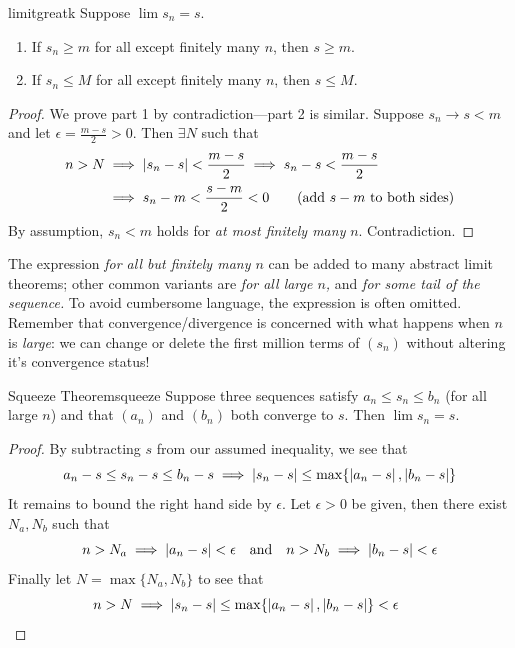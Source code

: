 \begin{thm}{}{limitgreatk}
	Suppose $\lim s_n=s$.
	\begin{enumerate}
	  \item If $s_n\ge m$ for all except finitely many $n$, then $s\ge m$.
	  \item If $s_n\le M$ for all except finitely many $n$, then $s\le M$.
	\end{enumerate} 
\end{thm}

\begin{proof}
	We prove part 1 by contradiction---part 2 is similar.\smallbreak
	Suppose $s_n\to s<m$ and let $\epsilon=\frac{m-s}2>0$. Then $\exists N$ such that
	\begin{align*}
	n>N&\implies \left| s_n-s\right|<\frac{m-s}2\implies s_n-s<\frac{m-s}2\\
	&\implies s_n-m<\frac{s-m}2<0\tag*{(add $s-m$ to both sides)}
	\end{align*}
	By assumption, $s_n<m$ holds for \emph{at most finitely many} $n$. Contradiction.
\end{proof}

The expression \emph{for all but finitely many $n$} can be added to many abstract limit theorems; other common variants are \emph{for all large $n$,} and \emph{for some tail of the sequence.} To avoid cumbersome language, the expression is often omitted. Remember that convergence/divergence is concerned with what happens when $n$ is \emph{large}: we can change or delete the first million terms of $(s_n)$ without altering it's convergence status!

\vfil\vfil
\goodbreak


\begin{thm}{Squeeze Theorem}{squeeze}
	Suppose three sequences satisfy $a_n\le s_n\le b_n$ (for all large $n$) and that $(a_n)$ and $(b_n)$ both converge to $s$. Then $\lim s_n=s$.
\end{thm}

\begin{proof}
	By subtracting $s$ from our assumed inequality, we see that
	\[a_n-s\le s_n-s\le b_n-s\implies\left| s_n-s\right|\le\max\{\left| a_n-s\right|,\left| b_n-s\right|\}\]
	It remains to bound the right hand side by $\epsilon$. Let $\epsilon>0$ be given, then there exist $N_a,N_b$ such that
	\[n>N_a\implies \left| a_n-s\right|<\epsilon\quad\text{and}\quad n>N_b\implies \left| b_n-s\right|<\epsilon\]
	Finally let $N=\max\{N_a,N_b\}$ to see that
	\[n>N\implies \left| s_n-s\right|\le\max\{\left| a_n-s\right|,\left| b_n-s\right|\}<\epsilon\tag*{\qedhere}\]
\end{proof}



